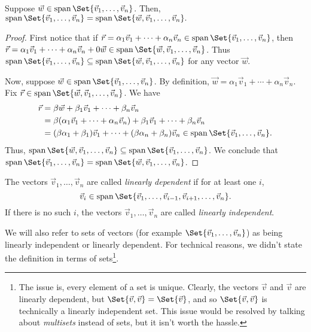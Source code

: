 \begin{theorem}
	Suppose $\vec w\in\Span\Set{\vec v_1,\ldots,\vec v_n}$. Then, 
	$
		\Span\Set{\vec v_1,\ldots,\vec v_n}=\Span\Set{\vec w,\vec v_1,\ldots,\vec v_n}.
	$
\end{theorem}
\begin{proof}
	First notice that if $\vec r=\alpha_1\vec v_1+\cdots+\alpha_n\vec v_n\in\Span\Set{\vec v_1,\ldots,\vec v_n}$,
	then $\vec r=\alpha_1\vec v_1+\cdots+\alpha_n\vec v_n+0\vec w\in \Span\Set{\vec w,\vec v_1,\ldots,\vec v_n}$.
	Thus $\Span\Set{\vec v_1,\ldots,\vec v_n}\subseteq \Span\Set{\vec w,\vec v_1,\ldots,\vec v_n}$ 
	for any vector $\vec w$.

	Now, suppose $\vec w\in \Span\Set{\vec v_1,\ldots,\vec v_n}$. By definition, $\vec w=\alpha_1\vec v_1+\cdots+\alpha_n\vec v_n$.
	Fix $\vec r\in\Span\Set{\vec w,\vec v_1,\ldots,\vec v_n}$.  We have
	\begin{align*}
		\vec r &=
		\beta\vec w+\beta_1\vec v_1+\cdots+\beta_n\vec v_n \\ &=
		\beta(\alpha_1\vec v_1+\cdots+\alpha_n\vec v_n) + \beta_1\vec v_1+\cdots+\beta_n\vec v_n\\
		&= (\beta\alpha_1+\beta_1)\vec v_1+\cdots+(\beta\alpha_n+\beta_n)\vec v_n\in\Span\Set{\vec v_1,\ldots,\vec v_n}.
	\end{align*}
	Thus, $\Span\Set{\vec w,\vec v_1,\ldots,\vec v_n}\subseteq \Span\Set{\vec v_1,\ldots,\vec v_n}$. We
	conclude that $\Span\Set{\vec v_1,\ldots,\vec v_n}=\Span\Set{\vec w,\vec v_1,\ldots,\vec v_n}$.
\end{proof}


\begin{definition}
	\label{DEFLININD}
	The vectors $\vec v_1,\ldots,\vec v_n$ are called \emph{linearly dependent} if 
	for at least one $i$, 
	\[
		\vec v_i \in \Span\Set{\vec v_1,\ldots,\vec v_{i-1},\vec v_{i+1},\ldots,\vec v_n}.
	\]
	If there is no such $i$, the vectors $\vec v_1,\ldots,\vec v_n$ are called \emph{linearly
	independent}.
\end{definition}
We will also refer to sets of vectors (for example $\Set{\vec v_1,\ldots,\vec v_n}$) as being linearly
independent or linearly dependent. For technical reasons, we didn't state the definition in terms
of sets\footnote{ The issue is, every element of a set is unique. Clearly, the vectors $\vec v$ and $\vec v$
are linearly dependent, but $\Set{\vec v,\vec v}=\Set{\vec v}$, and so $\Set{\vec v,\vec v}$ is technically
a linearly independent set. This issue would be resolved by talking about \emph{multisets} instead of sets,
but it isn't worth the hassle.}.

